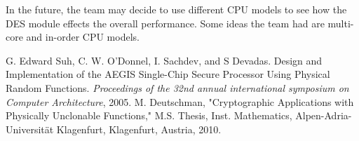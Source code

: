 \documentclass[letterpaper, 10 pt, conference]{ieeeconf}  %
\begin{document}
In the future, the team may decide to use different CPU models to see how the DES module effects the overall performance. Some ideas the team had are multi-core and in-order CPU models. 

\addtolength{\textheight}{-12cm}   %

















\begin{thebibliography}{99}

 G. Edward Suh, C. W. O'Donnel, I. Sachdev, and S Devadas. Design and Implementation of the AEGIS Single-Chip Secure Processor Using Physical Random Functions. \emph{Proceedings of the 32nd annual international symposium on Computer Architecture}, 2005.
 M. Deutschman, "Cryptographic Applications with Physically Unclonable Functions," M.S. Thesis, Inst. Mathematics, Alpen-Adria-Universit\"{a}t Klagenfurt, Klagenfurt, Austria, 2010.
 

\end{thebibliography}
\end{document}
